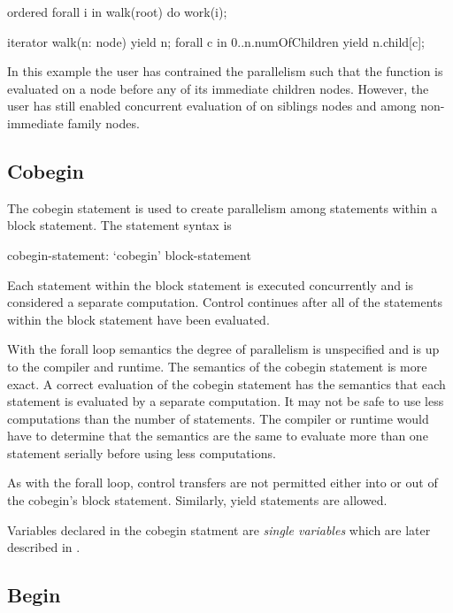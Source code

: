 \begin{example}
\begin{chapel}
ordered forall i in walk(root) do
  work(i);

iterator walk(n: node) {
  yield n;
  forall c in 0..n.numOfChildren {
      yield n.child[c];
  }
}
\end{chapel}
In this example the user has contrained the parallelism such that the
function  is evaluated on a node before any of its
immediate children nodes.  However, the user has still enabled concurrent
evaluation of  on siblings nodes and among non-immediate
family nodes.
\end{example}


\subsection{Cobegin}
\label{Cobegin}

The cobegin statement is used to create parallelism among statements
within a block statement. The  statement syntax is
\begin{syntax}
cobegin-statement:
  `cobegin' block-statement
\end{syntax}
Each statement within the block statement is executed concurrently and
is considered a separate computation. Control continues after all of
the statements within the block statement have been evaluated.

With the forall loop semantics the degree of parallelism is
unspecified and is up to the compiler and runtime. The semantics of
the cobegin statement is more exact. A correct evaluation of the
cobegin statement has the semantics that each statement is evaluated
by a separate computation. It may not be safe to use less computations
than the number of statements. The compiler or runtime would have to
determine that the semantics are the same to evaluate more than one
statement serially before using less computations.

As with the forall loop, control transfers are not permitted
either into or out of the cobegin's block statement. Similarly,
yield statements are allowed.

Variables declared in the cobegin statment are {\em single variables}
which are later described in .


\subsection{Begin}
\label{Begin}

